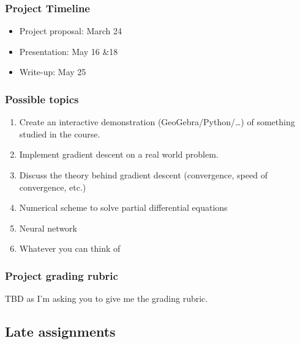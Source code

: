 \documentclass[
]{article}
\begin{document}
\hypertarget{project-timeline}{%
\subsubsection*{Project Timeline}\label{project-timeline}}

\begin{itemize}
\item
  Project proposal: March 24
\item
  Presentation: May 16 \&18
\item
  Write-up: May 25
\end{itemize}

\hypertarget{possible-topics}{%
\subsubsection*{Possible topics}\label{possible-topics}}

\begin{enumerate}
\def\labelenumi{\arabic{enumi}.}
\item
  Create an interactive demonstration (GeoGebra/Python/\ldots) of something studied in the course.
\item
  Implement gradient descent on a real world problem.
\item
  Discuss the theory behind gradient descent (convergence, speed of convergence, etc.)
\item
  Numerical scheme to solve partial differential equations
\item
  Neural network
\item
  Whatever you can think of
\end{enumerate}

\hypertarget{project-grading-rubric}{%
\subsubsection*{Project grading rubric}\label{project-grading-rubric}}

TBD as I'm asking you to give me the grading rubric.

\hypertarget{late-assignments}{%
\subsection*{Late assignments}\label{late-assignments}}
\end{document}
